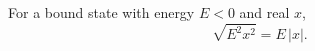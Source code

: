 \documentclass{article}
\begin{document}
For a bound state with energy $E<0$ and real $x$,
\begin{equation}
\sqrt{E^2 x^2} = E\,|x| .
\label{eq:p}
\end{equation}
\end{document}

